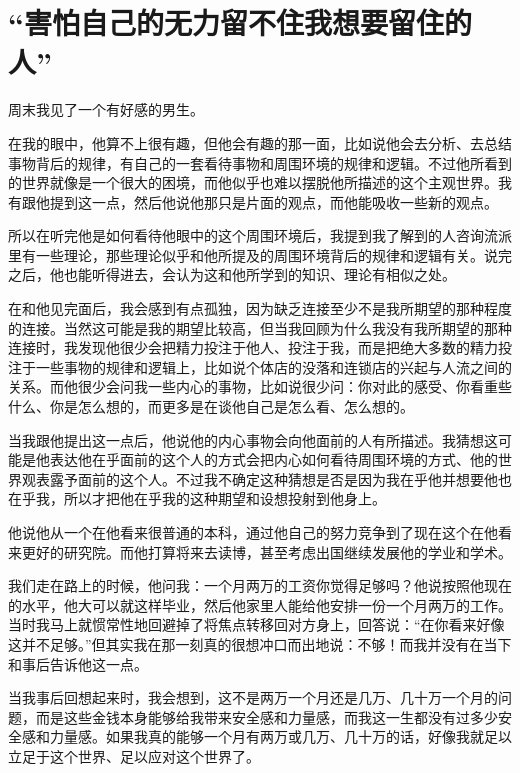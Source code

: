 \chapter{“害怕自己的无力留不住我想要留住的人”}





周末我见了一个有好感的男生。

在我的眼中，他算不上很有趣，但他会有趣的那一面，比如说他会去分析、去总结事物背后的规律，有自己的一套看待事物和周围环境的规律和逻辑。不过他所看到的世界就像是一个很大的困境，而他似乎也难以摆脱他所描述的这个主观世界。我有跟他提到这一点，然后他说他那只是片面的观点，而他能吸收一些新的观点。

所以在听完他是如何看待他眼中的这个周围环境后，我提到我了解到的人咨询流派里有一些理论，那些理论似乎和他所提及的周围环境背后的规律和逻辑有关。说完之后，他也能听得进去，会认为这和他所学到的知识、理论有相似之处。

在和他见完面后，我会感到有点孤独，因为缺乏连接\pozhehao{}至少不是我所期望的那种程度的连接。当然这可能是我的期望比较高，但当我回顾为什么我没有我所期望的那种连接时，我发现他很少会把精力投注于他人、投注于我，而是把绝大多数的精力投注于一些事物的规律和逻辑上，比如说个体店的没落和连锁店的兴起与人流之间的关系。而他很少会问我一些内心的事物，比如说很少问：你对此的感受、你看重些什么、你是怎么想的，而更多是在谈他自己是怎么看、怎么想的。

当我跟他提出这一点后，他说他的内心事物会向他面前的人有所描述。我猜想这可能是他表达他在乎面前的这个人的方式\pozhehao{}会把内心如何看待周围环境的方式、他的世界观表露予面前的这个人。不过我不确定这种猜想是否是因为我在乎他并想要他也在乎我，所以才把他在乎我的这种期望和设想投射到他身上。

他说他从一个在他看来很普通的本科，通过他自己的努力竞争到了现在这个在他看来更好的研究院。而他打算将来去读博，甚至考虑出国继续发展他的学业和学术。

我们走在路上的时候，他问我：一个月两万的工资你觉得足够吗？他说按照他现在的水平，他大可以就这样毕业，然后他家里人能给他安排一份一个月两万的工作。当时我马上就惯常性地回避掉了\pozhehao{}将焦点转移回对方身上，回答说：“在你看来好像这并不足够。”但其实我在那一刻真的很想冲口而出地说：不够！而我并没有在当下和事后告诉他这一点。

当我事后回想起来时，我会想到，这不是两万一个月还是几万、几十万一个月的问题，而是这些金钱本身能够给我带来安全感和力量感，而我这一生都没有过多少安全感和力量感。如果我真的能够一个月有两万或几万、几十万的话，好像我就足以立足于这个世界、足以应对这个世界了。

